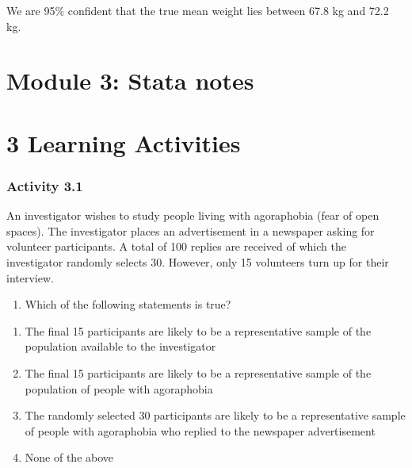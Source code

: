 \documentclass[
]{memoir}
\providecommand{\tightlist}{%
  \setlength{\itemsep}{0pt}\setlength{\parskip}{0pt}}
\begin{document}
We are 95\% confident that the true mean weight lies between 67.8 kg and 72.2 kg.

\hypertarget{module-3-stata-notes}{%
\chapter*{Module 3: Stata notes}\label{module-3-stata-notes}}

\hypertarget{learning-activities-2}{%
\chapter*{\texorpdfstring{\textbf{3} Learning Activities}{3 Learning Activities}}\label{learning-activities-2}}

\hypertarget{activity-3.1}{%
\subsection*{Activity 3.1}\label{activity-3.1}}

An investigator wishes to study people living with agoraphobia (fear of open spaces). The investigator places an advertisement in a newspaper asking for volunteer participants. A total of 100 replies are received of which the investigator randomly selects 30. However, only 15 volunteers turn up for their interview.

\begin{enumerate}
\def\labelenumi{\arabic{enumi}.}
\tightlist
\item
  Which of the following statements is true?
\end{enumerate}

\begin{enumerate}
\def\labelenumi{\alph{enumi})}
\tightlist
\item
  The final 15 participants are likely to be a representative sample of the population available to the investigator
\item
  The final 15 participants are likely to be a representative sample of the population of people with agoraphobia
\item
  The randomly selected 30 participants are likely to be a representative sample of people with agoraphobia who replied to the newspaper advertisement
\item
  None of the above
\end{enumerate}
\end{document}
